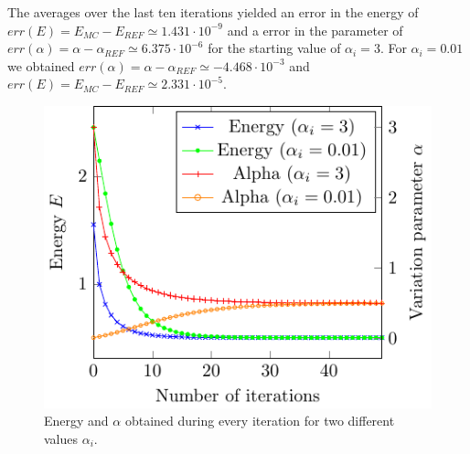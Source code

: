 The averages over the last ten iterations yielded an
error in the energy of $err(E)=E_{MC}-E_{REF}\simeq 1.431\cdot 10^{-9}$ and a error in the parameter of $err(\alpha)=\alpha - \alpha_{REF} \simeq 6.375\cdot 10^{-6}$ for the starting value of $\alpha_i=3$. For $\alpha_i = 0.01$ we obtained $err(\alpha)=\alpha - \alpha_{REF} \simeq -4.468 \cdot 10^{-3}$ and $err(E)=E_{MC}-E_{REF}\simeq 2.331\cdot 10^{-5}$. 
\begin{figure}[th]
	\begin{center}
		\includegraphics[scale=0.9]{graphs/ho-e-alpha-iterations.pdf}
		\caption{
			Energy and $\alpha$ obtained during every iteration for two different values $\alpha_i$.
			}
		\label{fig:Ho_it}
	\end{center}
\end{figure}
